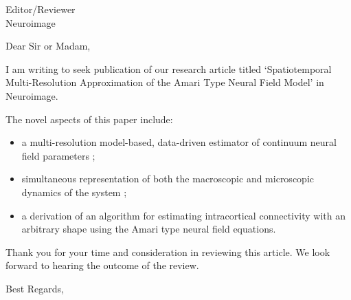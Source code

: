 \documentclass[a4paper,10pt]{letter}
\begin{document}
\vspace{-1cm}
\begin{letter}{Editor/Reviewer \\ Neuroimage}

\opening{Dear Sir or Madam,}




I am writing to seek publication of our research article titled `Spatiotemporal Multi-Resolution Approximation of the Amari Type Neural Field Model' in Neuroimage.


The novel aspects of this paper include:
\begin{itemize}
	\item a multi-resolution model-based, data-driven estimator of continuum neural field parameters ;
	\item simultaneous representation of both the macroscopic and microscopic dynamics of the system ;
	\item a derivation of an algorithm for estimating intracortical connectivity with an arbitrary shape using the Amari type neural field equations.
\end{itemize}


Thank you for your time and consideration in reviewing this article. We look forward to hearing the outcome of the review.

\closing{Best Regards,}


\end{letter}
\end{document}
